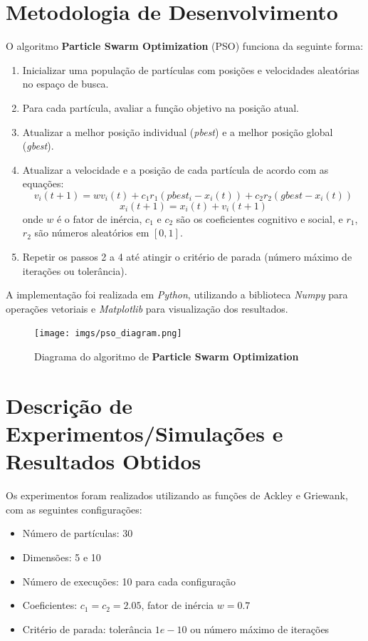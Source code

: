 \documentclass[12pt]{article}
\begin{document}
\section{Metodologia de Desenvolvimento}
\label{sec:metodologia_de_desenvolvimento}

O algoritmo \textbf{Particle Swarm Optimization} (PSO) funciona da seguinte forma:
\begin{enumerate}
  \item Inicializar uma população de partículas com posições e velocidades aleatórias no espaço de busca.
  \item Para cada partícula, avaliar a função objetivo na posição atual.
  \item Atualizar a melhor posição individual (\textit{pbest}) e a melhor posição global (\textit{gbest}).
  \item Atualizar a velocidade e a posição de cada partícula de acordo com as equações:
    \begin{equation}
      v_{i}(t+1) = w v_{i}(t) + c_1 r_1 (pbest_{i} - x_{i}(t)) + c_2 r_2 (gbest - x_{i}(t))
    \end{equation}
    \begin{equation}
      x_{i}(t+1) = x_{i}(t) + v_{i}(t+1)
    \end{equation}
    onde $w$ é o fator de inércia, $c_1$ e $c_2$ são os coeficientes cognitivo e social, e $r_1$, $r_2$ são números aleatórios em $[0,1]$.
  \item Repetir os passos 2 a 4 até atingir o critério de parada (número máximo de iterações ou tolerância).
\end{enumerate}

A implementação foi realizada em \textit{Python}, utilizando a biblioteca \textit{Numpy} para operações vetoriais e \textit{Matplotlib} para visualização dos resultados.

\begin{figure}[H]
    \centering
    \texttt{[image: imgs/pso\_diagram.png]}
    \caption{Diagrama do algoritmo de \textbf{Particle Swarm Optimization}}
    \label{fig:metodologia}
\end{figure}

\section{Descrição de Experimentos/Simulações e Resultados Obtidos}
\label{sec:descicao_de_experimentos_/_simulacoes_e_resultados_obtidos}

Os experimentos foram realizados utilizando as funções de Ackley e Griewank, com as seguintes configurações:
\begin{itemize}
    \item Número de partículas: 30
    \item Dimensões: 5 e 10
    \item Número de execuções: 10 para cada configuração
    \item Coeficientes: $c_1 = c_2 = 2.05$, fator de inércia $w = 0.7$
    \item Critério de parada: tolerância $1e-10$ ou número máximo de iterações
\end{itemize}
\end{document}
